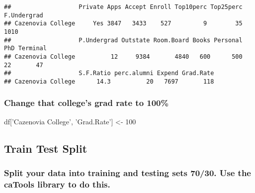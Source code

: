 \documentclass[]{article}
\newenvironment{Shaded}{\begin{snugshade}}{\end{snugshade}}
\newcommand{\DataTypeTok}[1]{\textcolor[rgb]{0.13,0.29,0.53}{#1}}
\newcommand{\DecValTok}[1]{\textcolor[rgb]{0.00,0.00,0.81}{#1}}
\newcommand{\FloatTok}[1]{\textcolor[rgb]{0.00,0.00,0.81}{#1}}
\newcommand{\KeywordTok}[1]{\textcolor[rgb]{0.13,0.29,0.53}{\textbf{#1}}}
\newcommand{\NormalTok}[1]{#1}
\newcommand{\OperatorTok}[1]{\textcolor[rgb]{0.81,0.36,0.00}{\textbf{#1}}}
\newcommand{\OtherTok}[1]{\textcolor[rgb]{0.56,0.35,0.01}{#1}}
\newcommand{\StringTok}[1]{\textcolor[rgb]{0.31,0.60,0.02}{#1}}
\begin{document}
\begin{verbatim}
##                   Private Apps Accept Enroll Top10perc Top25perc F.Undergrad
## Cazenovia College     Yes 3847   3433    527         9        35        1010
##                   P.Undergrad Outstate Room.Board Books Personal PhD Terminal
## Cazenovia College          12     9384       4840   600      500  22       47
##                   S.F.Ratio perc.alumni Expend Grad.Rate
## Cazenovia College      14.3          20   7697       118
\end{verbatim}

\hypertarget{change-that-colleges-grad-rate-to-100}{%
\subsubsection{Change that college's grad rate to
100\%}\label{change-that-colleges-grad-rate-to-100}}

\begin{Shaded}
\begin{Highlighting}[]
\NormalTok{df[}\StringTok{'Cazenovia College'}\NormalTok{, }\StringTok{'Grad.Rate'}\NormalTok{] <-}\StringTok{ }\DecValTok{100}
\end{Highlighting}
\end{Shaded}

\hypertarget{train-test-split}{%
\subsection{Train Test Split}\label{train-test-split}}

\hypertarget{split-your-data-into-training-and-testing-sets-7030.-use-the-catools-library-to-do-this.}{%
\subsubsection{Split your data into training and testing sets 70/30. Use
the caTools library to do
this.}\label{split-your-data-into-training-and-testing-sets-7030.-use-the-catools-library-to-do-this.}}

\begin{Shaded}
\end{Shaded}
\end{document}
